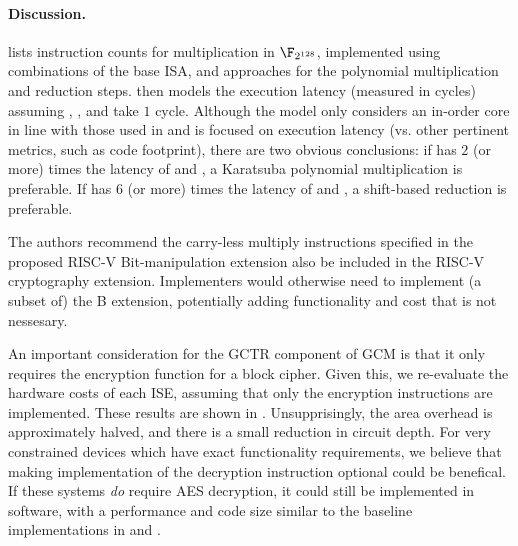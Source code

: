 \paragraph{Discussion.}

lists instruction counts for 
multiplication in $\F_{2^{128}}$,
implemented using combinations of the base ISA, and approaches
for the polynomial multiplication and reduction steps.
then models the execution latency 
(measured in cycles)
assuming , , and  take $1$ cycle.
Although the model only considers an in-order core in line with those used
in  and is focused on execution latency
(vs. other pertinent metrics, such as code footprint),
there are two obvious conclusions:
if
has $2$ (or more) times the latency of
 and ,
a 
Karatsuba
polynomial multiplication
is preferable.
If
has $6$ (or more) times the latency of
 and ,
a shift-based 
reduction 
is preferable.

The authors recommend the carry-less multiply instructions
specified in the proposed RISC-V Bit-manipulation extension also be included
in the RISC-V cryptography extension.
Implementers would otherwise need to implement (a subset of) the B
extension, potentially adding functionality and cost that is not
nessesary.

An important consideration for the GCTR component of GCM is that it only
requires the encryption function for a block cipher.
Given this, we re-evaluate the hardware costs of each ISE, assuming that
only the encryption instructions are implemented.
These results are shown in .
Unsupprisingly, the area overhead is approximately halved, and there is
a small reduction in circuit depth.
For very constrained devices which have exact functionality
requirements, we believe that making implementation of the decryption
instruction optional could be benefical.
If these systems {\em do} require AES decryption, it could still be
implemented in software, with a performance and code size similar
to the baseline implementations in
and
.

